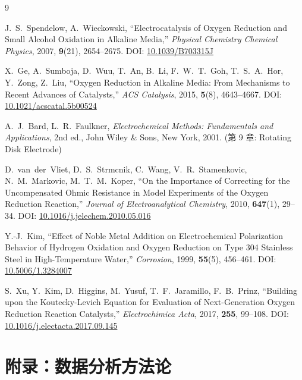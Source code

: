\documentclass[12pt,a4paper]{ctexart}
\begin{document}
\newpage

\begin{thebibliography}{9}

J.~S.~Spendelow, A.~Wieckowski,
``Electrocatalysis of Oxygen Reduction and Small Alcohol Oxidation in Alkaline Media,''
\textit{Physical Chemistry Chemical Physics}, 2007, \textbf{9}(21), 2654--2675.
DOI: \href{https://doi.org/10.1039/B703315J}{10.1039/B703315J}

X.~Ge, A.~Sumboja, D.~Wuu, T.~An, B.~Li, F.~W.~T.~Goh, T.~S.~A.~Hor,
Y.~Zong, Z.~Liu,
``Oxygen Reduction in Alkaline Media: From Mechanisms to Recent Advances of Catalysts,''
\textit{ACS Catalysis}, 2015, \textbf{5}(8), 4643--4667.
DOI: \href{https://doi.org/10.1021/acscatal.5b00524}{10.1021/acscatal.5b00524}

A.~J.~Bard, L.~R.~Faulkner,
\textit{Electrochemical Methods: Fundamentals and Applications}, 2nd ed.,
John Wiley \& Sons, New York, 2001. (第 9 章: Rotating Disk Electrode)

D.~van~der~Vliet, D.~S.~Strmcnik, C.~Wang, V.~R.~Stamenkovic,
N.~M.~Markovic, M.~T.~M.~Koper,
``On the Importance of Correcting for the Uncompensated Ohmic Resistance
in Model Experiments of the Oxygen Reduction Reaction,''
\textit{Journal of Electroanalytical Chemistry}, 2010, \textbf{647}(1), 29--34.
DOI: \href{https://doi.org/10.1016/j.jelechem.2010.05.016}{10.1016/j.jelechem.2010.05.016}

Y.-J.~Kim,
``Effect of Noble Metal Addition on Electrochemical Polarization Behavior
of Hydrogen Oxidation and Oxygen Reduction on Type 304 Stainless Steel
in High-Temperature Water,''
\textit{Corrosion}, 1999, \textbf{55}(5), 456--461.
DOI: \href{https://doi.org/10.5006/1.3284007}{10.5006/1.3284007}

S.~Xu, Y.~Kim, D.~Higgins, M.~Yusuf, T.~F.~Jaramillo, F.~B.~Prinz,
``Building upon the Koutecky-Levich Equation for Evaluation of Next-Generation
Oxygen Reduction Reaction Catalysts,''
\textit{Electrochimica Acta}, 2017, \textbf{255}, 99--108.
DOI: \href{https://doi.org/10.1016/j.electacta.2017.09.145}{10.1016/j.electacta.2017.09.145}

\end{thebibliography}

\newpage

\appendix
\section{附录：数据分析方法论}
\end{document}
